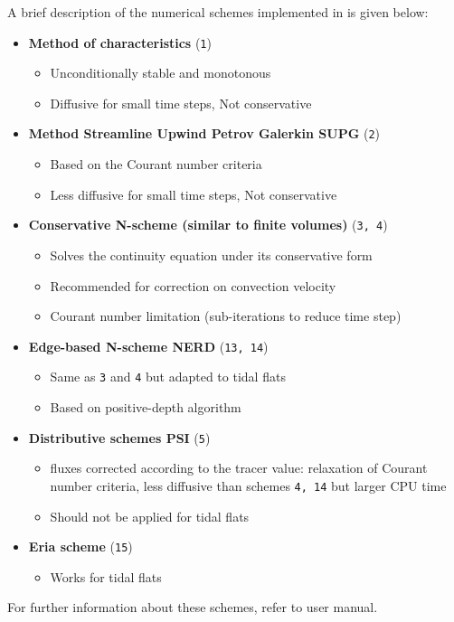 A brief description of the numerical schemes implemented in \gaia{} is given below:
\begin{itemize}
\item \textbf{Method of characteristics} (\texttt{1})
\begin{itemize}
\item Unconditionally stable and monotonous
\item Diffusive for small time steps, Not conservative
\end{itemize}
\item \textbf{Method Streamline Upwind Petrov Galerkin SUPG} (\texttt{2})
\begin{itemize}
\item Based on the Courant number criteria
\item Less diffusive for small time steps, Not conservative
\end{itemize}
\item \textbf{Conservative N-scheme (similar to finite volumes)} (\texttt{3, 4})
\begin{itemize}
\item Solves the continuity equation under its conservative form
\item Recommended for correction on convection velocity
\item Courant number limitation (sub-iterations to reduce time step)
\end{itemize}
\item \textbf{Edge-based N-scheme NERD} (\texttt{13, 14})
\begin{itemize}
\item Same as \texttt{3} and \texttt{4} but adapted to tidal flats
\item Based on positive-depth algorithm
\end{itemize}
\item \textbf{Distributive schemes PSI} (\texttt{5})
\begin{itemize}
\item fluxes corrected according to the tracer value: relaxation of Courant number criteria, less diffusive than
schemes \texttt{4, 14} but larger CPU time
\item Should not be applied for tidal flats
\end{itemize}
\item \textbf{Eria scheme} (\texttt{15})
\begin{itemize}
\item Works for tidal flats
\end{itemize}
\end{itemize}
For further information about these schemes, refer to  user manual.

